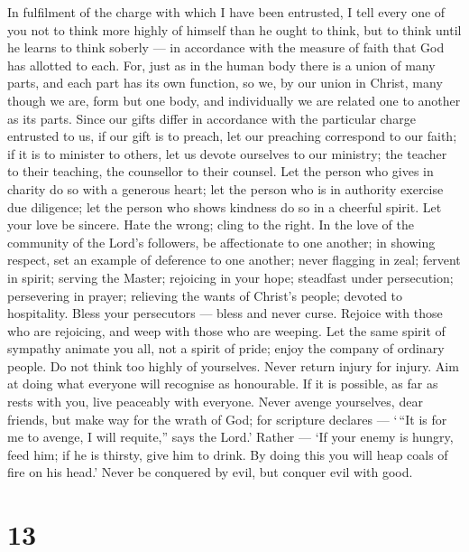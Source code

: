  In fulfilment of the charge with which I have been
entrusted, I tell every one of you not to think more highly of himself
than he ought to think, but to think until he learns to think soberly
--- in accordance with the measure of faith that God has allotted to
each.  For, just as in the human body there is a union of
many parts, and each part has its own function,  so we, by
our union in Christ, many though we are, form but one body, and
individually we are related one to another as its parts. 
Since our gifts differ in accordance with the particular charge
entrusted to us, if our gift is to preach, let our preaching correspond
to our faith;  if it is to minister to others, let us devote
ourselves to our ministry; the teacher to their teaching, 
the counsellor to their counsel. Let the person who gives in charity do
so with a generous heart; let the person who is in authority exercise
due diligence; let the person who shows kindness do so in a cheerful
spirit.  Let your love be sincere. Hate the wrong; cling to
the right.  In the love of the community of the Lord's
followers, be affectionate to one another; in showing respect, set an
example of deference to one another;  never flagging in
zeal; fervent in spirit; serving the Master;  rejoicing in
your hope; steadfast under persecution; persevering in prayer;
 relieving the wants of Christ's people; devoted to
hospitality.  Bless your persecutors --- bless and never
curse.  Rejoice with those who are rejoicing, and weep with
those who are weeping.  Let the same spirit of sympathy
animate you all, not a spirit of pride; enjoy the company of ordinary
people. Do not think too highly of yourselves.  Never
return injury for injury. Aim at doing what everyone will recognise as
honourable.  If it is possible, as far as rests with you,
live peaceably with everyone.  Never avenge yourselves,
dear friends, but make way for the wrath of God; for scripture declares
--- `\,``It is for me to avenge, I will requite,'' says the Lord.'
 Rather --- `If your enemy is hungry, feed him; if he is
thirsty, give him to drink. By doing this you will heap coals of fire on
his head.'  Never be conquered by evil, but conquer evil
with good.

\hypertarget{section-12}{%
\section{13}\label{section-12}}


